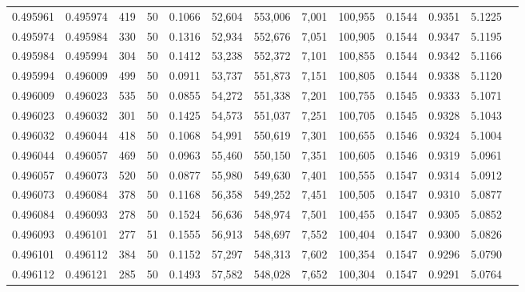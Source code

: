 \begin{tabular}{rrrrrrrrrrrrr}
0.495961 & 0.495974 & 419 &  50 &                                     0.1066 &  52,604 & 553,006 &   7,001 & 100,955 & 0.1544 & 0.9351 & 5.1225 \\
0.495974 & 0.495984 & 330 &  50 &                                     0.1316 &  52,934 & 552,676 &   7,051 & 100,905 & 0.1544 & 0.9347 & 5.1195 \\
0.495984 & 0.495994 & 304 &  50 &                                     0.1412 &  53,238 & 552,372 &   7,101 & 100,855 & 0.1544 & 0.9342 & 5.1166 \\
0.495994 & 0.496009 & 499 &  50 &                                     0.0911 &  53,737 & 551,873 &   7,151 & 100,805 & 0.1544 & 0.9338 & 5.1120 \\
0.496009 & 0.496023 & 535 &  50 &                                     0.0855 &  54,272 & 551,338 &   7,201 & 100,755 & 0.1545 & 0.9333 & 5.1071 \\
0.496023 & 0.496032 & 301 &  50 &                                     0.1425 &  54,573 & 551,037 &   7,251 & 100,705 & 0.1545 & 0.9328 & 5.1043 \\
0.496032 & 0.496044 & 418 &  50 &                                     0.1068 &  54,991 & 550,619 &   7,301 & 100,655 & 0.1546 & 0.9324 & 5.1004 \\
0.496044 & 0.496057 & 469 &  50 &                                     0.0963 &  55,460 & 550,150 &   7,351 & 100,605 & 0.1546 & 0.9319 & 5.0961 \\
0.496057 & 0.496073 & 520 &  50 &                                     0.0877 &  55,980 & 549,630 &   7,401 & 100,555 & 0.1547 & 0.9314 & 5.0912 \\
0.496073 & 0.496084 & 378 &  50 &                                     0.1168 &  56,358 & 549,252 &   7,451 & 100,505 & 0.1547 & 0.9310 & 5.0877 \\
0.496084 & 0.496093 & 278 &  50 &                                     0.1524 &  56,636 & 548,974 &   7,501 & 100,455 & 0.1547 & 0.9305 & 5.0852 \\
0.496093 & 0.496101 & 277 &  51 &                                     0.1555 &  56,913 & 548,697 &   7,552 & 100,404 & 0.1547 & 0.9300 & 5.0826 \\
0.496101 & 0.496112 & 384 &  50 &                                     0.1152 &  57,297 & 548,313 &   7,602 & 100,354 & 0.1547 & 0.9296 & 5.0790 \\
0.496112 & 0.496121 & 285 &  50 &                                     0.1493 &  57,582 & 548,028 &   7,652 & 100,304 & 0.1547 & 0.9291 & 5.0764 \\

\end{tabular}
